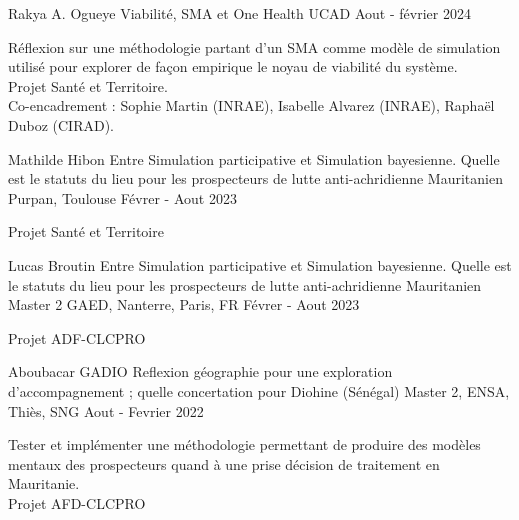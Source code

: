 \vspace{2em}
\vspace{2em}
\begin{cventries}
    \cventry
        {Rakya A. Ogueye} %
        {Viabilité, SMA et One Health} %
        {UCAD } %
        {Aout - février 2024} %
        {
        \begin{cvitems} %
            Réflexion sur une méthodologie partant d’un SMA comme modèle de simulation utilisé pour explorer de façon empirique le noyau de viabilité du système.\\
            Projet Santé et Territoire.\\
            Co-encadrement : Sophie Martin (INRAE), Isabelle Alvarez (INRAE), Raphaël Duboz (CIRAD).
        \end{cvitems}
        }

    \cventry
        {Mathilde Hibon} %
        {Entre Simulation participative et Simulation bayesienne. Quelle est le statuts du lieu pour les prospecteurs de lutte anti-achridienne Mauritanien} %
        {Purpan, Toulouse} %
        {Févrer - Aout 2023} %
        {
        \begin{cvitems} %
        Projet Santé et Territoire
        \end{cvitems}
        }
    \cventry
        {Lucas Broutin} %
        {Entre Simulation participative et Simulation bayesienne. Quelle est le statuts du lieu pour les prospecteurs de lutte anti-achridienne Mauritanien} %
        {Master 2 GAED, Nanterre, Paris, FR} %
        {Févrer - Aout 2023} %
        {
        \begin{cvitems} %
        Projet ADF-CLCPRO
        \end{cvitems}
        }
    \cventry
        {Aboubacar GADIO} %
        {Reflexion géographie pour une exploration d'accompagnement ; quelle concertation pour Diohine (Sénégal)} %
        {Master 2, ENSA, Thiès, SNG} %
        {Aout - Fevrier 2022} %
        {
        \begin{cvitems} %
            Tester et implémenter une méthodologie permettant de produire des modèles mentaux des prospecteurs quand à une prise décision de traitement en Mauritanie.\\
            Projet AFD-CLCPRO
        \end{cvitems}
        }


\end{cventries}
